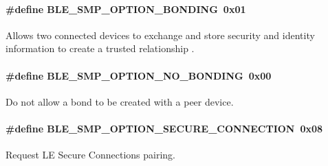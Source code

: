 \paragraph[{\texorpdfstring{B\+L\+E\+\_\+\+S\+M\+P\+\_\+\+O\+P\+T\+I\+O\+N\+\_\+\+B\+O\+N\+D\+I\+NG}{BLE_SMP_OPTION_BONDING}}]{\setlength{\rightskip}{0pt plus 5cm}\#define B\+L\+E\+\_\+\+S\+M\+P\+\_\+\+O\+P\+T\+I\+O\+N\+\_\+\+B\+O\+N\+D\+I\+NG~0x01}\hypertarget{group___b_l_e___s_m_p___o_p_t_i_o_n_ga3667137b0691c33a3c4db428fd12b2a9}{}\label{group___b_l_e___s_m_p___o_p_t_i_o_n_ga3667137b0691c33a3c4db428fd12b2a9}
Allows two connected devices to exchange and store security and identity information to create a trusted relationship . 
\paragraph[{\texorpdfstring{B\+L\+E\+\_\+\+S\+M\+P\+\_\+\+O\+P\+T\+I\+O\+N\+\_\+\+N\+O\+\_\+\+B\+O\+N\+D\+I\+NG}{BLE_SMP_OPTION_NO_BONDING}}]{\setlength{\rightskip}{0pt plus 5cm}\#define B\+L\+E\+\_\+\+S\+M\+P\+\_\+\+O\+P\+T\+I\+O\+N\+\_\+\+N\+O\+\_\+\+B\+O\+N\+D\+I\+NG~0x00}\hypertarget{group___b_l_e___s_m_p___o_p_t_i_o_n_ga0d9886fdb9751d986a1b2339bf275216}{}\label{group___b_l_e___s_m_p___o_p_t_i_o_n_ga0d9886fdb9751d986a1b2339bf275216}
Do not allow a bond to be created with a peer device. 
\paragraph[{\texorpdfstring{B\+L\+E\+\_\+\+S\+M\+P\+\_\+\+O\+P\+T\+I\+O\+N\+\_\+\+S\+E\+C\+U\+R\+E\+\_\+\+C\+O\+N\+N\+E\+C\+T\+I\+ON}{BLE_SMP_OPTION_SECURE_CONNECTION}}]{\setlength{\rightskip}{0pt plus 5cm}\#define B\+L\+E\+\_\+\+S\+M\+P\+\_\+\+O\+P\+T\+I\+O\+N\+\_\+\+S\+E\+C\+U\+R\+E\+\_\+\+C\+O\+N\+N\+E\+C\+T\+I\+ON~0x08}\hypertarget{group___b_l_e___s_m_p___o_p_t_i_o_n_ga77d185d90b9983fea3d46a0422ccb710}{}\label{group___b_l_e___s_m_p___o_p_t_i_o_n_ga77d185d90b9983fea3d46a0422ccb710}
Request LE Secure Connections pairing. 
